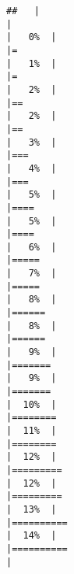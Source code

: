 \documentclass[
]{book}
\begin{document}
\begin{verbatim}
##   |                                                                              |                                                                      |   0%  |                                                                              |=                                                                     |   1%  |                                                                              |=                                                                     |   2%  |                                                                              |==                                                                    |   2%  |                                                                              |==                                                                    |   3%  |                                                                              |===                                                                   |   4%  |                                                                              |===                                                                   |   5%  |                                                                              |====                                                                  |   5%  |                                                                              |====                                                                  |   6%  |                                                                              |=====                                                                 |   7%  |                                                                              |=====                                                                 |   8%  |                                                                              |======                                                                |   8%  |                                                                              |======                                                                |   9%  |                                                                              |=======                                                               |   9%  |                                                                              |=======                                                               |  10%  |                                                                              |========                                                              |  11%  |                                                                              |========                                                              |  12%  |                                                                              |=========                                                             |  12%  |                                                                              |=========                                                             |  13%  |                                                                              |==========                                                            |  14%  |                                                                              |==========                                                            |  
\end{verbatim}
\end{document}
